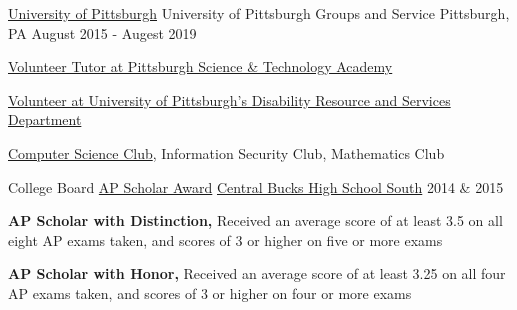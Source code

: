 
\vspace{-1mm}
\begin{cventries}

  \cventry
    {\href{https://www.pitt.edu/}{University of Pittsburgh}} %
    {University of Pittsburgh Groups and Service} %
    {Pittsburgh, PA} %
    {August 2015 - Augest 2019} %
    {
      \begin{cvitems} %
        \item {\href{https://pittsburghscitech.com}{Volunteer Tutor at Pittsburgh Science \& Technology Academy}}
        \item {\href{https://www.studentaffairs.pitt.edu/drs/}{Volunteer at University of Pittsburgh’s Disability Resource and Services Department}}
        \item {\href{https://pittcsc.org/}{Computer Science Club}, Information Security Club, Mathematics Club}
      \end{cvitems}
    }

  \cventry
    {College Board} %
    {\href{https://apstudents.collegeboard.org/awards-recognitions/ap-scholar-award}{AP Scholar Award}} %
    {\href{https://www.cbsd.org/cbsouth}{Central Bucks High School South}} %
    {2014 \& 2015} %
    {
      \begin{cvitems} %
        \item {\textbf{AP Scholar with Distinction,} Received an average score of at least 3.5 on all eight AP exams taken, and scores of 3 or higher on five or more exams}
        \item {\textbf{AP Scholar with Honor,} Received an average score of at least 3.25 on all four AP exams taken, and scores of 3 or higher on four or more exams}
      \end{cvitems}
    }


\end{cventries}
